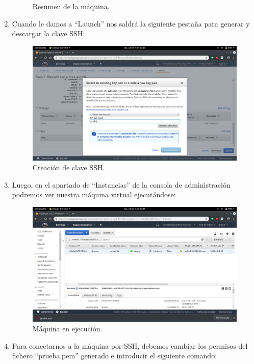 \begin{enumerate}
\begin{figure}[h]
		\caption{Resumen de la máquina.}
		\label{Resumen de la máquina}
	\end{figure}
	\item Cuando le damos a ``Launch'' nos saldrá la siguiente pestaña para generar y descargar la clave SSH:
	\begin{figure}[h]
		\centering
		\includegraphics[scale=0.28]{ImagenesAWS/13.png}
		\caption{Creación de clave SSH.}
		\label{Creación de clave SSH}
	\end{figure}
\newpage
	\item Luego, en el apartado de ``Instancias'' de la consola de administración podremos ver nuestra máquina virtual ejecutándose:
	\begin{figure}[h]
		\centering
		\includegraphics[scale=0.28]{ImagenesAWS/15.png}
		\caption{Máquina en ejecución.}
		\label{Máquina en ejecución}
	\end{figure}
	\item Para conectarnos a la máquina por SSH, debemos cambiar los permisos del fichero ``prueba.pem'' generado e introducir el siguiente comando:
	\begin{center}

\end{center}
\end{enumerate}
